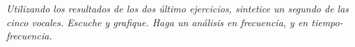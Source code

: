 


\emph{Utilizando los resultados de los dos último ejercicios, sintetice un segundo de las cinco vocales.
Escuche y grafique. Haga un análisis en frecuencia, y en tiempo-frecuencia.}

